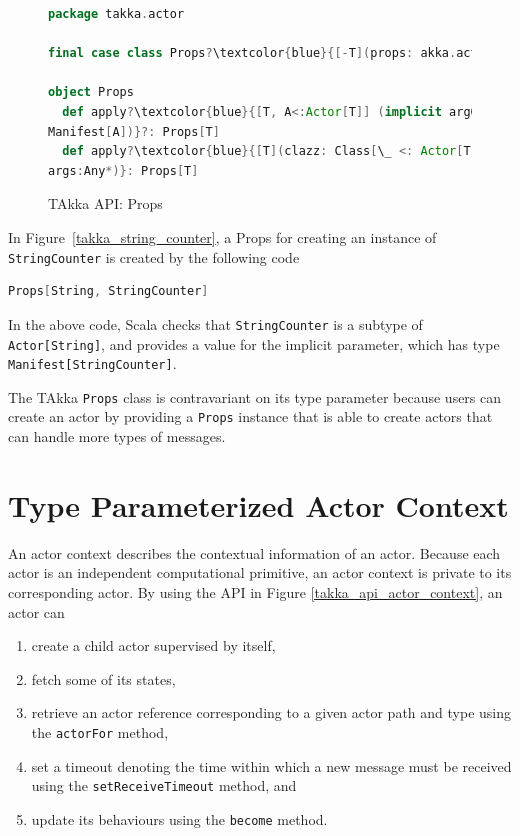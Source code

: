 \begin{figure}[!h]
\begin{lstlisting}[language=scala, escapechar=?]
package takka.actor

final case class Props?\textcolor{blue}{[-T](props: akka.actor.Props)}?

object Props
  def apply?\textcolor{blue}{[T, A<:Actor[T]] (implicit arg0: 
Manifest[A])}?: Props[T] 
  def apply?\textcolor{blue}{[T](clazz: Class[\_ <: Actor[T]], 
args:Any*)}: Props[T]
\end{lstlisting}
    \caption{TAkka API: Props}
    \label{takka_props}
\end{figure}

In Figure~\ref{takka_string_counter}, a Props for creating an instance of {\tt 
StringCounter} is created by the following code
\begin{lstlisting}[language=scala]
  Props[String, StringCounter]
\end{lstlisting}
In the above code, Scala checks that {\tt StringCounter} is a 
subtype of\\ {\tt Actor[String]}, and provides a value for the implicit 
parameter, which has type {\tt Manifest[StringCounter]}.

The TAkka {\tt Props} class is contravariant on its type parameter because 
users can create an actor by providing a {\tt Props} instance that is able to 
create actors that can handle more types of messages.


\section{Type Parameterized Actor Context}
\label{takka_actor_context}

An actor context describes the contextual information of an actor. Because each 
actor is an independent computational primitive, an actor context is private to 
its corresponding actor.  By using the API in Figure 
\ref{takka_api_actor_context}, an actor can
\begin{enumerate}
\item create a child actor supervised by itself,
\item fetch some of its states,
\item retrieve an actor reference 
corresponding to a given actor path and type using the {\tt actorFor} method,
\item set a timeout denoting the time within which
a new message must be received using the {\tt setReceiveTimeout} method, and
\item update its behaviours using the {\tt become} method.  
\end{enumerate}

